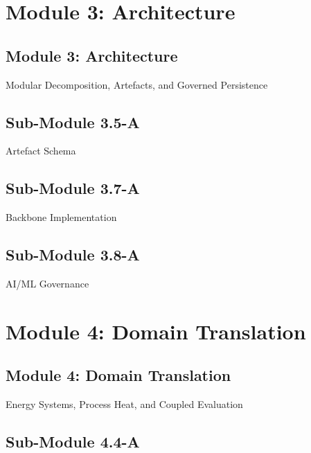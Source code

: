\documentclass[
  11pt,
  a4paper,
  twoside,
  openright]{scrbook}
\begin{document}
\part{Module 3: Architecture}

\chapter{Module 3: Architecture}\label{module-3-architecture-1}

Modular Decomposition, Artefacts, and Governed Persistence

\hfill\break

\chapter{Sub-Module 3.5-A}\label{sub-module-3.5-a}

Artefact Schema

\hfill\break

\chapter{Sub-Module 3.7-A}\label{sub-module-3.7-a}

Backbone Implementation

\hfill\break

\chapter{Sub-Module 3.8-A}\label{sub-module-3.8-a}

AI/ML Governance

\hfill\break

\part{Module 4: Domain Translation}

\chapter{Module 4: Domain
Translation}\label{module-4-domain-translation-1}

Energy Systems, Process Heat, and Coupled Evaluation

\hfill\break

\chapter{Sub-Module 4.4-A}\label{sub-module-4.4-a}
\end{document}

